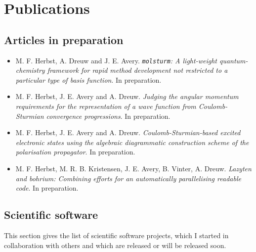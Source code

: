 \chapter*{Publications}
{}

\section*{Articles in preparation}
{}
\begin{itemize}
	\item M. F. Herbst, A. Dreuw and J. E. Avery.
		\textit{\texttt{molsturm}: A light-weight quantum-chemistry framework for rapid method development not restricted to a particular type of basis function}. In preparation.
	\item M. F. Herbst, J. E. Avery and A. Dreuw.
		\textit{Judging the angular momentum requirements for the representation of a wave function from Coulomb-Sturmian convergence progressions}. In preparation.
	\item M. F. Herbst, J. E. Avery and A. Dreuw.
		\textit{Coulomb-Sturmian-based excited electronic states using the algebraic diagrammatic construction scheme of the polarisation propagator}. In preparation.
	\item M. F. Herbst, M. R. B. Kristensen, J. E. Avery, B. Vinter, A. Dreuw.
		\textit{Lazyten and bohrium: Combining efforts for an automatically parallelising readable code}. \linebreak In preparation.
\end{itemize}


\section*{Scientific software}
{}
This section gives the list of scientific software projects,
which I started in collaboration with others
and which are released or will be released soon.

